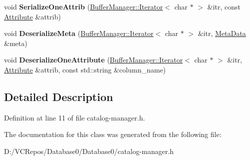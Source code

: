 \begin{DoxyCompactItemize}
\item 
\mbox{\label{class_catalog_manager_a89bceed7f145ac65d36fbe725971095d}} 
void {\bfseries Serialize\+One\+Attrib} (\mbox{\hyperlink{class_buffer_manager_1_1_iterator}{Buffer\+Manager\+::\+Iterator}}$<$ char $\ast$ $>$ \&itr, const \mbox{\hyperlink{struct_attribute}{Attribute}} \&attrib)
\item 
\mbox{\label{class_catalog_manager_a84f329d0ce4091bfeaf05d8c4fddf857}} 
void {\bfseries Deserialize\+Meta} (\mbox{\hyperlink{class_buffer_manager_1_1_iterator}{Buffer\+Manager\+::\+Iterator}}$<$ char $\ast$ $>$ \&itr, \mbox{\hyperlink{struct_meta_data}{Meta\+Data}} \&meta)
\item 
\mbox{\label{class_catalog_manager_a9ef09234d95960fc12fbfc0c6b0a02df}} 
void {\bfseries Deserialize\+One\+Attribute} (\mbox{\hyperlink{class_buffer_manager_1_1_iterator}{Buffer\+Manager\+::\+Iterator}}$<$ char $\ast$ $>$ \&itr, \mbox{\hyperlink{struct_attribute}{Attribute}} \&attrib, const std\+::string \&column\+\_\+name)
\end{DoxyCompactItemize}


\subsection{Detailed Description}


Definition at line 11 of file catalog-\/manager.\+h.



The documentation for this class was generated from the following file\+:\begin{DoxyCompactItemize}
\item 
D\+:/\+V\+C\+Repos/\+Database0/\+Database0/catalog-\/manager.\+h\end{DoxyCompactItemize}
